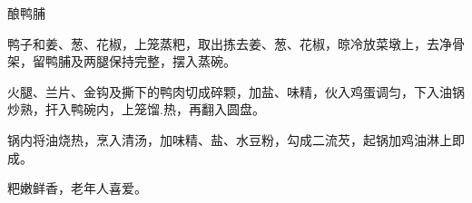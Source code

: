 \begin{recipe}{酿鸭脯}

\ingredients


\preparation

\step 鸭子和姜、葱、花椒，上笼蒸粑，取出拣去姜、葱、花椒，晾冷放菜墩上，去净骨
架，留鸭脯及两腿保持完整，摆入蒸碗。

\step 火腿、兰片、金钩及撕下的鸭肉切成碎颗，加盐、味精，伙入鸡蛋调匀，下入油锅
炒熟，扞入鸭碗内，上笼馏.热，再翻入圆盘。

\step 锅内将油烧热，烹入清汤，加味精、盐、水豆粉，勾成二流芡，起锅加鸡油淋上即
成。

\features

粑嫩鲜香，老年人喜爱。

\end{recipe}

